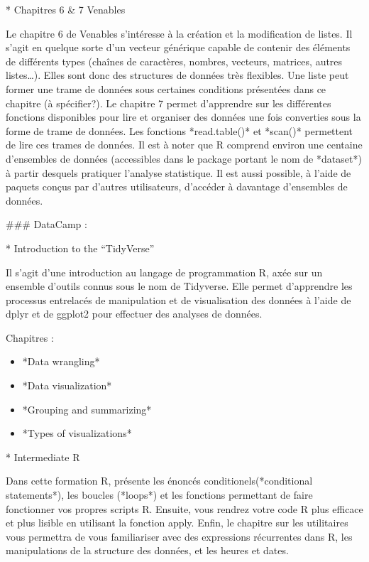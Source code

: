 \documentclass[
  letterpaper,
]{scrbook}
\begin{document}
* Chapitres 6 \& 7 Venables

Le chapitre 6 de Venables s'intéresse à la création et la modification
de listes. Il s'agit en quelque sorte d'un vecteur générique capable de
contenir des éléments de différents types (chaînes de caractères,
nombres, vecteurs, matrices, autres listes\ldots). Elles sont donc des
structures de données très flexibles. Une liste peut former une trame de
données sous certaines conditions présentées dans ce chapitre (à
spécifier?). Le chapitre 7 permet d'apprendre sur les différentes
fonctions disponibles pour lire et organiser des données une fois
converties sous la forme de trame de données. Les fonctions
*read.table()* et *scan()* permettent de lire ces trames de données. Il
est à noter que R comprend environ une centaine d'ensembles de données
(accessibles dans le package portant le nom de *dataset*) à partir
desquels pratiquer l'analyse statistique. Il est aussi possible, à
l'aide de paquets conçus par d'autres utilisateurs, d'accéder à
davantage d'ensembles de données.

\#\#\# DataCamp :

* Introduction to the ``TidyVerse''

Il s'agit d'une introduction au langage de programmation R, axée sur un
ensemble d'outils connus sous le nom de Tidyverse. Elle permet
d'apprendre les processus entrelacés de manipulation et de visualisation
des données à l'aide de dplyr et de ggplot2 pour effectuer des analyses
de données.

Chapitres :

\begin{itemize}
\item
  *Data wrangling*
\item
  *Data visualization*
\item
  *Grouping and summarizing*
\item
  *Types of visualizations*
\end{itemize}

* Intermediate R

Dans cette formation R, présente les énoncés conditionels(*conditional
statements*), les boucles (*loops*) et les fonctions permettant de faire
fonctionner vos propres scripts R. Ensuite, vous rendrez votre code R
plus efficace et plus lisible en utilisant la fonction apply. Enfin, le
chapitre sur les utilitaires vous permettra de vous familiariser avec
des expressions récurrentes dans R, les manipulations de la structure
des données, et les heures et dates.
\end{document}
